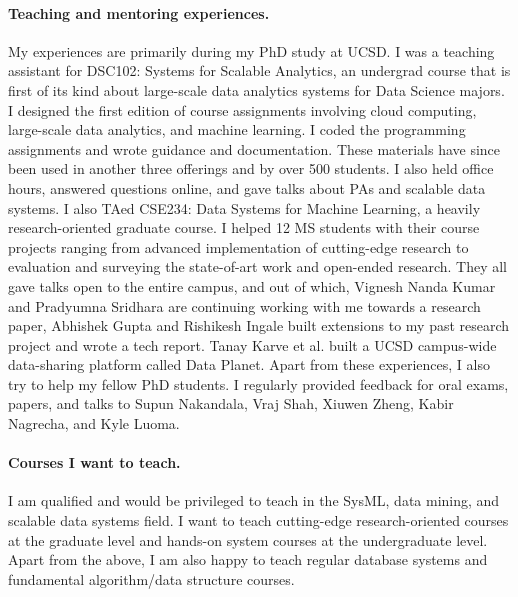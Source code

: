 \documentclass[letterpaper]{article}
\begin{document}
\paragraph{Teaching and mentoring experiences.} My experiences are primarily during my PhD study at UCSD. I was a teaching assistant for DSC102: Systems for Scalable Analytics, an undergrad course that is first of its kind about large-scale data analytics systems for Data Science majors. I designed the first edition of course assignments involving cloud computing, large-scale data analytics, and machine learning. I coded the programming assignments and wrote guidance and documentation. These materials have since been used in another three offerings and by over 500 students. I also held office hours, answered questions online, and gave talks about PAs and scalable data systems. I also TAed CSE234: Data Systems for Machine Learning, a heavily research-oriented graduate course. I helped 12 MS students with their course projects ranging from advanced implementation of cutting-edge research to evaluation and surveying the state-of-art work and open-ended research. They all gave talks open to the entire campus, and out of which, Vignesh Nanda Kumar and Pradyumna Sridhara are continuing working with me towards a research paper, Abhishek Gupta and Rishikesh Ingale built extensions to my past research project and wrote a tech report. Tanay Karve et al. built a UCSD campus-wide data-sharing platform called Data Planet. Apart from these experiences, I also try to help my fellow PhD students. I regularly provided feedback for oral exams, papers, and talks to Supun Nakandala, Vraj Shah, Xiuwen Zheng, Kabir Nagrecha, and Kyle Luoma.

\paragraph{Courses I want to teach.} I am qualified and would be privileged to teach in the SysML, data mining, and scalable data systems field. I want to teach cutting-edge research-oriented courses at the graduate level and hands-on system courses at the undergraduate level. Apart from the above, I am also happy to teach regular database systems and fundamental algorithm/data structure courses.



%
%
\end{document}
